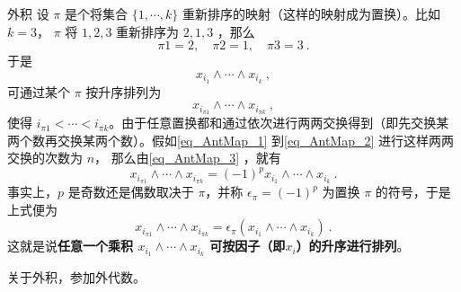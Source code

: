 \begin{example}{外积}
设 $\pi$ 是个将集合 $\{1,\cdots,k\}$ 重新排序的映射（这样的映射成为置换）。比如$k=3$， $\pi$ 将 $1,2,3$ 重新排序为 $2,1,3$ ，那么
\begin{equation}
\pi 1=2,\quad\pi2=1,\quad \pi3=3~.
\end{equation}
于是
\begin{equation}\label{eq_AntMap_1}
x_{i_1}\wedge\cdots\wedge x_{i_k}~,
\end{equation}
可通过某个 $\pi$ 按升序排列为
\begin{equation}\label{eq_AntMap_2}
x_{i_{\pi1}}\wedge\cdots\wedge x_{i_{\pi k}}~,
\end{equation}
使得 $i_{\pi1}<\cdots< i_{\pi k}$。由于任意置换都和通过依次进行两两交换得到（即先交换某两个数再交换某两个数）。假如\autoref{eq_AntMap_1} 到\autoref{eq_AntMap_2} 进行这样两两交换的次数为 $n$，
那么由\autoref{eq_AntMap_3} ，就有
\begin{equation}
x_{i_{\pi1}}\wedge\cdots\wedge x_{i_{\pi k}}=(-1)^p x_{i_1}\wedge\cdots\wedge x_{i_k}~.
\end{equation}
事实上，$p$ 是奇数还是偶数取决于 $\pi$，并称 $\epsilon_\pi=(-1)^p$ 为置换 $\pi$ 的符号，于是上式便为
\begin{equation}
x_{i_{\pi1}}\wedge\cdots\wedge x_{i_{\pi k}}=\epsilon_\pi (x_{i_1}\wedge\cdots\wedge x_{i_k})~.
\end{equation}
这就是说\textbf{任意一个乘积 $x_{i_1}\wedge\cdots\wedge x_{i_k}$ 可按因子（即$x_i$）的升序进行排列}。

关于外积，参加外代数。
\end{example}
